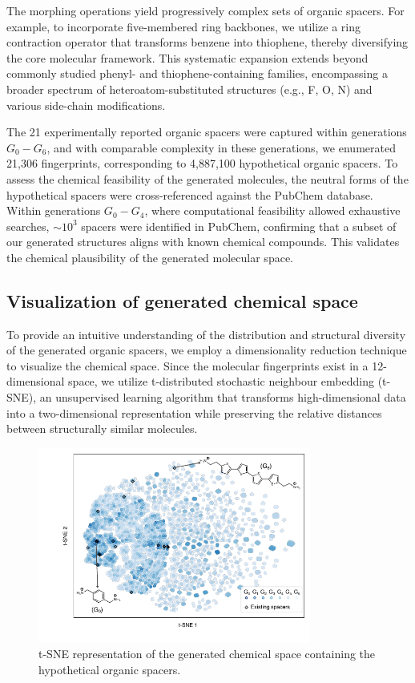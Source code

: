 The morphing operations yield progressively complex sets of organic spacers. For example, to incorporate five-membered ring backbones, we utilize a ring contraction operator that transforms benzene into thiophene, thereby diversifying the core molecular framework. This systematic expansion extends beyond commonly studied phenyl- and thiophene-containing families, encompassing a broader spectrum of heteroatom-substituted structures (e.g., F, O, N) and various side-chain modifications.

The 21 experimentally reported organic spacers were captured within generations $G_0-G_6$, and with comparable complexity in these generations, we enumerated 21,306 fingerprints, corresponding to 4,887,100 hypothetical organic spacers. To assess the chemical feasibility of the generated molecules, the neutral forms of the hypothetical spacers were cross-referenced against the PubChem database. Within generations $G_0-G_4$, where computational feasibility allowed exhaustive searches, $\sim10^3$ spacers were identified in PubChem, confirming that a subset of our generated structures aligns with known chemical compounds. This validates the chemical plausibility of the generated molecular space.

\subsection{Visualization of generated chemical space}

To provide an intuitive understanding of the distribution and structural diversity of the generated organic spacers, we employ a dimensionality reduction technique to visualize the chemical space. Since the molecular fingerprints exist in a 12-dimensional space, we utilize t-distributed stochastic neighbour embedding (t-SNE)\cite{RN551}, an unsupervised learning algorithm that transforms high-dimensional data into a two-dimensional representation while preserving the relative distances between structurally similar molecules.

\begin{figure}[htbp]
    \centering
    \includegraphics[width=0.8\textwidth]{figures/HT-ML/figure4-2.pdf}
    \caption{t-SNE representation of the generated chemical space containing the hypothetical organic spacers.}
    \label{fig:figure4.2}
\end{figure}

